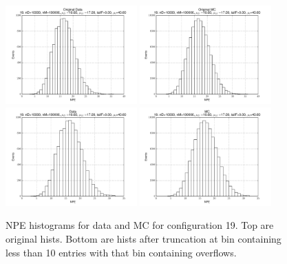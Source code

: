  \begin{figure}[htbp] \begin{center} 
\includegraphics[width=0.45\textwidth]{../FIGURES/19/FIG_Original_Data.pdf} 
\includegraphics[width=0.45\textwidth]{../FIGURES/19/FIG_Original_MC.pdf} 
\includegraphics[width=0.45\textwidth]{../FIGURES/19/FIG_Data.pdf} 
\includegraphics[width=0.45\textwidth]{../FIGURES/19/FIG_MC.pdf} 
\caption{NPE histograms for data and MC for configuration 19. Top are original hists. Bottom are hists after truncation at bin containing less than 10 entries with that bin containing overflows.} 
\label{tab:npe_19} 
\end{center} \end{figure} 

 